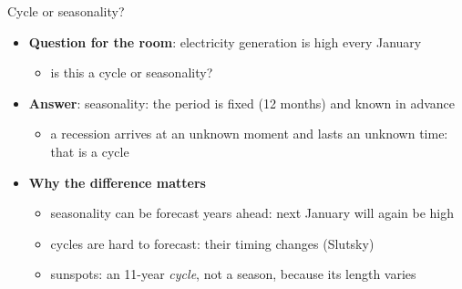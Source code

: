 \begin{frame}{Cycle or seasonality?}
\itemsize{\small}
\begin{itemize}
    \item \textbf{Question for the room}: electricity generation is high every January
    \begin{itemize}
        \item is this a cycle or seasonality?
    \end{itemize}
    \pause
    \item \textbf{Answer}: seasonality: the period is fixed (12 months) and known in advance
    \begin{itemize}
        \item a recession arrives at an unknown moment and lasts an unknown time: that is a cycle
    \end{itemize}
    \item \textbf{Why the difference matters}
    \begin{itemize}
        \item seasonality can be forecast years ahead: next January will again be high
        \item cycles are hard to forecast: their timing changes (Slutsky)
        \item sunspots: an 11-year \emph{cycle}, not a season, because its length varies
    \end{itemize}
\end{itemize}
\end{frame}

